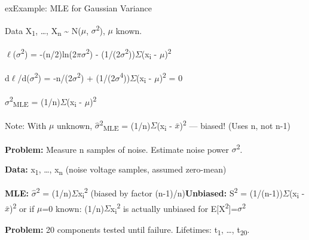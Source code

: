 \begin{PSbox}[unbreakable]{ex}{Example: MLE for Gaussian Variance}

Data X\textsubscript{1}, …, X\textsubscript{n} \textasciitilde{} N(\ensuremath{\mu}, \ensuremath{\sigma}\textsuperscript{2}), \ensuremath{\mu} known.

\ensuremath{\ell}(\ensuremath{\sigma}\textsuperscript{2}) = -(n/2)ln(2\ensuremath{\pi}\ensuremath{\sigma}\textsuperscript{2}) - (1/(2\ensuremath{\sigma}\textsuperscript{2}))\ensuremath{\Sigma}(x\textsubscript{i} - \ensuremath{\mu})\textsuperscript{2}

d\ensuremath{\ell}/d(\ensuremath{\sigma}\textsuperscript{2}) = -n/(2\ensuremath{\sigma}\textsuperscript{2}) + (1/(2\ensuremath{\sigma}\textsuperscript{4}))\ensuremath{\Sigma}(x\textsubscript{i} - \ensuremath{\mu})\textsuperscript{2} = 0

\ensuremath{\hat{\sigma}}\textsuperscript{2}\textsubscript{MLE} = (1/n)\ensuremath{\Sigma}(x\textsubscript{i} - \ensuremath{\mu})\textsuperscript{2}

Note: With \ensuremath{\mu} unknown, \ensuremath{\hat{\sigma}}\textsuperscript{2}\textsubscript{MLE} = (1/n)\ensuremath{\Sigma}(x\textsubscript{i} - \ensuremath{\bar{x}})\textsuperscript{2} — biased! (Uses n, not n-1)

\end{PSbox}



\textbf{Problem:} Measure n samples of noise. Estimate noise power \ensuremath{\sigma}\textsuperscript{2}.

\textbf{Data:} x\textsubscript{1}, …, x\textsubscript{n} (noise voltage samples, assumed zero-mean)

\textbf{MLE:} \ensuremath{\hat{\sigma}}\textsuperscript{2} = (1/n)\ensuremath{\Sigma}x\textsubscript{i}\textsuperscript{2} (biased by factor (n-1)/n)\PSbr{}\textbf{Unbiased:} S\textsuperscript{2} = (1/(n-1))\ensuremath{\Sigma}(x\textsubscript{i} - \ensuremath{\bar{x}})\textsuperscript{2} or if \ensuremath{\mu}=0 known: (1/n)\ensuremath{\Sigma}x\textsubscript{i}\textsuperscript{2} is actually unbiased for E[X\textsuperscript{2}]=\ensuremath{\sigma}\textsuperscript{2}


\textbf{Problem:} 20 components tested until failure. Lifetimes: t\textsubscript{1}, …, t\textsubscript{20}.

